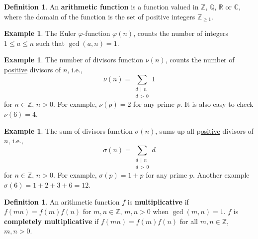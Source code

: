 \documentclass{amsbook}
\theoremstyle{plain}
\theoremstyle{definition}
\newtheorem{definition}[theorem]{Definition}
\newtheorem{example}[theorem]{Example}
\theoremstyle{remark}
\numberwithin{equation}{chapter}
\numberwithin{figure}{chapter}
\newcommand{\Q}{\mathbb{Q}}
\newcommand{\Z}{\mathbb{Z}}
\newcommand{\R}{\mathbb{R}}
\newcommand{\C}{\mathbb{C}}
\begin{document}
\begin{definition}
  An \textbf{arithmetic function} is a function valued in $\Z$, $\Q$, $\R$ or $\C$, where the domain of the function is the set of positive integers $\Z_{\geqslant 1}$.
\end{definition}
\begin{example}
  The Euler $\varphi$-function $\varphi(n)$, counts the number of integers $1 \leqslant a \leqslant n$ such that $\gcd (a, n) = 1$.
\end{example}
\begin{example}\label{ex:nu_func}
 The number of divisors function $\nu(n)$, counts the number of p\underline{ositive} divisors of $n$, i.e., 
\[
  \nu (n) = \sum_{\substack{d \, \mid \, n \\ d \, > \, 0}} 1
\]for $n \in \Z$, $n > 0$. For example, $\nu(p) = 2$ for any prime $p$. It is also easy to check $\nu(6) = 4$.
\end{example}
\begin{example}\label{ex:sigma_func}
  The sum of divisors function $\sigma(n)$, sums up all p\underline{ositive} divisors of $n$, i.e., \[
  \sigma (n) = \sum_{\substack{d \, \mid \, n \\ d \, > \, 0}} d
\]
for $n \in \Z$, $n > 0$. For example, $\sigma (p) = 1 + p$ for any prime $p$. Another example $\sigma(6) = 1 + 2 + 3 + 6 = 12$.
\end{example}

\begin{definition}
  An arithmetic function $f$ is \textbf{multiplicative} if $f(mn) = f(m)f(n)$ for $m,n \in \Z$, $m,n > 0$ when $\gcd (m, n) = 1$. $f$ is \textbf{completely multiplicative} if $f(mn) = f(m)f(n)$ for all $m,n \in \Z$, $m,n > 0$.
\end{definition}
\end{document}
